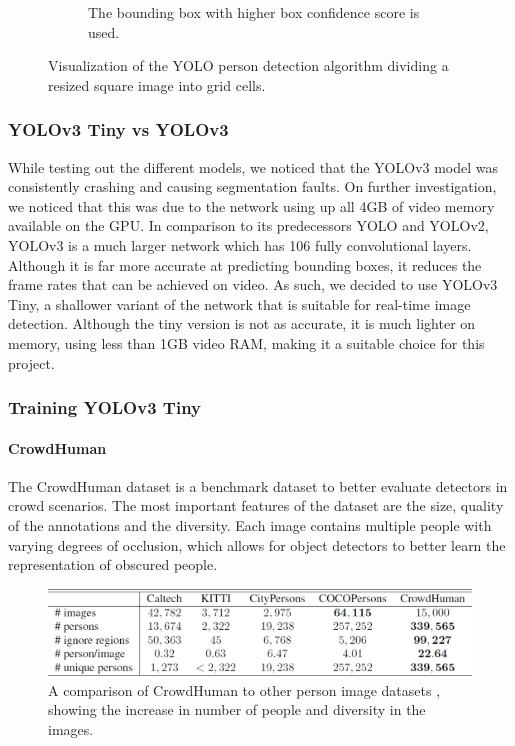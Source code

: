 \begin{figure}[ht]
\begin{subfigure}[b]{.45\textwidth}
		\caption{The bounding box with higher box confidence score is used.}
	\end{subfigure}
	\vspace{-1\baselineskip}
	\begin{center}
		\caption{Visualization of the YOLO person detection algorithm dividing a resized square image into grid cells.}
		\label{fig:yoloViz}
	\end{center}
	\vspace{-2\baselineskip}
\end{figure}

\subsubsection{YOLOv3 Tiny vs YOLOv3}
While testing out the different models, we noticed that the YOLOv3 model was consistently crashing and causing segmentation faults. On further investigation, we noticed that this was due to the network using up all 4GB of video memory available on the GPU. In comparison to its predecessors YOLO and YOLOv2, YOLOv3 is a much larger network which has 106 fully convolutional layers. Although it is far more accurate at predicting bounding boxes, it reduces the frame rates that can be achieved on video. As such, we decided to use YOLOv3 Tiny, a shallower variant of the network that is suitable for real-time image detection. Although the tiny version is not as accurate, it is much lighter on memory, using less than 1GB video RAM, making it a suitable choice for this project.

\subsubsection{Training YOLOv3 Tiny}
\paragraph{CrowdHuman} The CrowdHuman dataset \cite{Shao} is a benchmark dataset to better evaluate detectors in crowd scenarios. The most important features of the dataset are the size, quality of the annotations and the diversity. Each image contains multiple people with varying degrees of occlusion, which allows for object detectors to better learn the representation of obscured people. 

\begin{figure}[ht]
	\centering
	\includegraphics[width=0.9\linewidth]{img/chapter5_implementation/crowdHumanStats.png}
	\caption{A comparison of CrowdHuman to other person image datasets \cite{Shao}, showing the increase in number of people and diversity in the images.}
	\label{fig:crowdHumanStats}
\end{figure}

